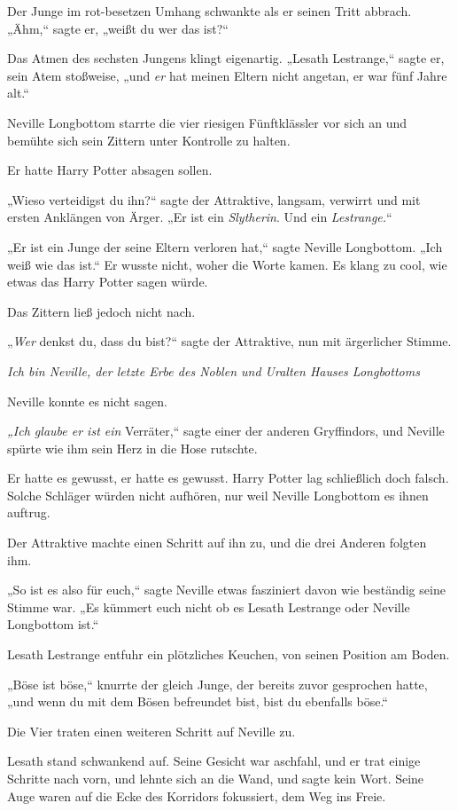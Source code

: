 {Der Junge im rot-besetzen Umhang schwankte als er seinen Tritt abbrach. „Ähm,“ sagte er, „weißt du wer das ist?“

Das Atmen des sechsten Jungens klingt eigenartig. „Lesath Lestrange,“ sagte er, sein Atem stoßweise, „und \emph{er} hat meinen Eltern nicht angetan, er war fünf Jahre alt.“

Neville Longbottom starrte die vier riesigen Fünftklässler vor sich an und bemühte sich sein Zittern unter Kontrolle zu halten.

Er hatte Harry Potter absagen sollen.

„Wieso verteidigst du ihn?“ sagte der Attraktive, langsam, verwirrt und mit ersten Anklängen von Ärger. „Er ist ein \emph{Slytherin}. Und ein \emph{Lestrange.}“

„Er ist ein Junge der seine Eltern verloren hat,“ sagte Neville Longbottom. „Ich weiß wie das ist.“ Er wusste nicht, woher die Worte kamen. Es klang zu cool, wie etwas das Harry Potter sagen würde.

Das Zittern ließ jedoch nicht nach.

„\emph{Wer} denkst du, dass du bist?“ sagte der Attraktive, nun mit ärgerlicher Stimme.

\emph{Ich bin Neville, der letzte Erbe des Noblen und Uralten Hauses Longbottoms \later}

Neville konnte es nicht sagen.

\emph{„Ich glaube er ist ein} Verräter,“ sagte einer der anderen Gryffindors, und Neville spürte wie ihm sein Herz in die Hose rutschte.

Er hatte es gewusst, er hatte es gewusst. Harry Potter lag schließlich doch falsch. Solche Schläger würden nicht aufhören, nur weil Neville Longbottom es ihnen auftrug.

Der Attraktive machte einen Schritt auf ihn zu, und die drei Anderen folgten ihm.

„So ist es also für euch,“ sagte Neville etwas fasziniert davon wie beständig seine Stimme war. „Es kümmert euch nicht ob es Lesath Lestrange oder Neville Longbottom ist.“

Lesath Lestrange entfuhr ein plötzliches Keuchen, von seinen Position am Boden.

„Böse ist böse,“ knurrte der gleich Junge, der bereits zuvor gesprochen hatte, „und wenn du mit dem Bösen befreundet bist, bist du ebenfalls böse.“

Die Vier traten einen weiteren Schritt auf Neville zu.

Lesath stand schwankend auf. Seine Gesicht war aschfahl, und er trat einige Schritte nach vorn, und lehnte sich an die Wand, und sagte kein Wort. Seine Auge waren auf die Ecke des Korridors fokussiert, dem Weg ins Freie.

}
